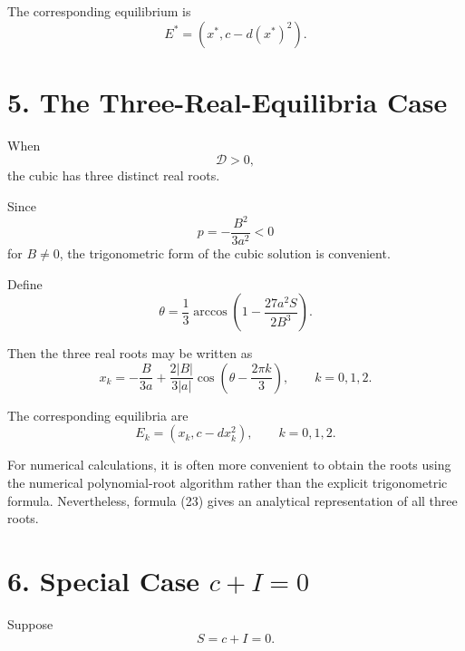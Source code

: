 \documentclass[11pt,a4paper]{article}
\begin{document}
The corresponding equilibrium is
\begin{equation}
\boxed{
E^*
=
\left(
x^*,
c-d(x^*)^2
\right).
}
\tag{21}
\end{equation}

\section{5. The Three-Real-Equilibria Case}

When
\begin{equation}
\mathcal{D}>0,
\end{equation}
the cubic has three distinct real roots.

Since
\begin{equation}
p=-\frac{B^2}{3a^2}<0
\end{equation}
for $B\neq0$, the trigonometric form of the cubic solution is
convenient.

Define
\begin{equation}
\boxed{
\theta
=
\frac13
\arccos
\left(
1-\frac{27a^2S}{2B^3}
\right).
}
\tag{22}
\end{equation}

Then the three real roots may be written as
\begin{equation}
\boxed{
x_k
=
-\frac{B}{3a}
+
\frac{2|B|}{3|a|}
\cos\left(
\theta-\frac{2\pi k}{3}
\right),
\qquad
k=0,1,2.
}
\tag{23}
\end{equation}

The corresponding equilibria are
\begin{equation}
\boxed{
E_k=
\left(
x_k,
c-dx_k^2
\right),
\qquad
k=0,1,2.
}
\tag{24}
\end{equation}

For numerical calculations, it is often more convenient to obtain
the roots using the numerical polynomial-root algorithm rather than
the explicit trigonometric formula. Nevertheless, formula (23) gives
an analytical representation of all three roots.

\section{6. Special Case $c+I=0$}

Suppose
\begin{equation}
S=c+I=0.
\end{equation}
\end{document}

